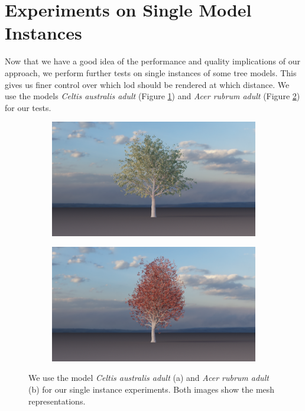 \section{Experiments on Single Model Instances}
\label{sec:experiments_on_single_model_instances}
Now that we have a good idea of the performance and quality implications of our approach, we perform further tests on single instances of some tree models.
This gives us finer control over which \ac{lod} should be rendered at which distance.
We use the models \textit{Celtis australis adult} (Figure \ref{fig:EU06a}) and \textit{Acer rubrum adult} (Figure \ref{fig:EA01a}) for our tests. %
\begin{figure}[t]
    \centering
    \begin{subfigure}[b]{0.49\linewidth}
        \centering
        \includegraphics[width=1\linewidth]{img/results/EU06a.png}
        \caption{}
        \label{fig:EU06a}
    \end{subfigure}
    \begin{subfigure}[b]{0.49\linewidth}
        \centering
        \includegraphics[width=1\linewidth]{img/results/EA01a.png}
        \caption{}
        \label{fig:EA01a}
    \end{subfigure}
	\caption[Models for single instance experiments]{We use the model \textit{Celtis australis adult} (a) and \textit{Acer rubrum adult} (b) for our single instance experiments. Both images show the mesh representations.}
	\label{fig:single_model_instances}
\end{figure}

